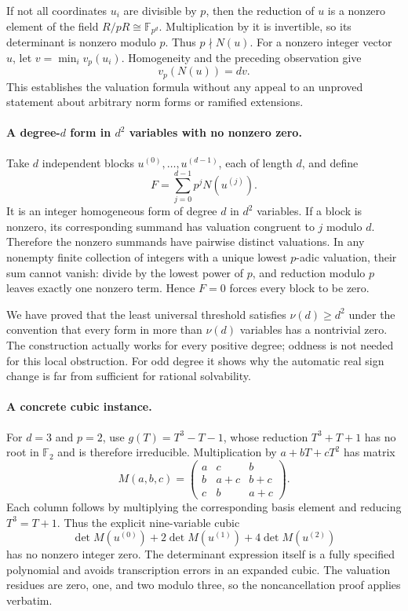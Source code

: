\documentclass[11pt,a4paper]{article}
\newcommand{\F}{\mathbb{F}}
\begin{document}
If not all coordinates $u_i$ are divisible by $p$, then the reduction of $u$ is a nonzero element of the field $R/pR\cong\F_{p^d}$. Multiplication by it is invertible, so its determinant is nonzero modulo $p$. Thus $p\nmid N(u)$. For a nonzero integer vector $u$, let $v=\min_i v_p(u_i)$. Homogeneity and the preceding observation give
\[
 v_p(N(u))=dv.
\]
This establishes the valuation formula without any appeal to an unproved statement about arbitrary norm forms or ramified extensions.

\paragraph{A degree-$d$ form in $d^2$ variables with no nonzero zero.}
Take $d$ independent blocks $u^{(0)},\ldots,u^{(d-1)}$, each of length $d$, and define
\[
 F=\sum_{j=0}^{d-1}p^j N(u^{(j)}).
\]
It is an integer homogeneous form of degree $d$ in $d^2$ variables. If a block is nonzero, its corresponding summand has valuation congruent to $j$ modulo $d$. Therefore the nonzero summands have pairwise distinct valuations. In any nonempty finite collection of integers with a unique lowest $p$-adic valuation, their sum cannot vanish: divide by the lowest power of $p$, and reduction modulo $p$ leaves exactly one nonzero term. Hence $F=0$ forces every block to be zero.

We have proved that the least universal threshold satisfies $\nu(d)\geq d^2$ under the convention that every form in more than $\nu(d)$ variables has a nontrivial zero. The construction actually works for every positive degree; oddness is not needed for this local obstruction. For odd degree it shows why the automatic real sign change is far from sufficient for rational solvability.

\paragraph{A concrete cubic instance.}
For $d=3$ and $p=2$, use $g(T)=T^3-T-1$, whose reduction $T^3+T+1$ has no root in $\F_2$ and is therefore irreducible. Multiplication by $a+bT+cT^2$ has matrix
\[
 M(a,b,c)=
 \begin{pmatrix}
 a&c&b\\ b&a+c&b+c\\ c&b&a+c
 \end{pmatrix}.
\]
Each column follows by multiplying the corresponding basis element and reducing $T^3=T+1$. Thus the explicit nine-variable cubic
\[
 \det M(u^{(0)})+2\det M(u^{(1)})+4\det M(u^{(2)})
\]
has no nonzero integer zero. The determinant expression itself is a fully specified polynomial and avoids transcription errors in an expanded cubic. The valuation residues are zero, one, and two modulo three, so the noncancellation proof applies verbatim.
\end{document}
